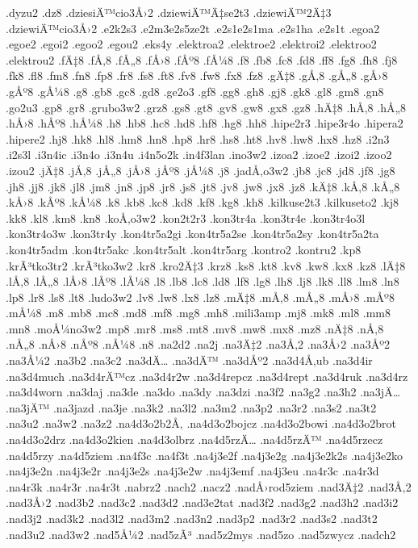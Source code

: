 {.dyzu2
.dz8
.dziesiÄ™cio3Å›2
.dziewiÄ™Ä‡se2t3
.dziewiÄ™2Ä‡3
.dziewiÄ™cio3Å›2
.e2k2s3
.e2m3e2s5ze2t
.e2s1e2s1ma
.e2s1ha
.e2s1t
.egoa2
.egoe2
.egoi2
.egoo2
.egou2
.eks4y
.elektroa2
.elektroe2
.elektroi2
.elektroo2
.elektrou2
.fÄ‡8
.fÅ‚8
.fÅ„8
.fÅ›8
.fÅº8
.fÅ¼8
.f8
.fb8
.fc8
.fd8
.ff8
.fg8
.fh8
.fj8
.fk8
.fl8
.fm8
.fn8
.fp8
.fr8
.fs8
.ft8
.fv8
.fw8
.fx8
.fz8
.gÄ‡8
.gÅ‚8
.gÅ„8
.gÅ›8
.gÅº8
.gÅ¼8
.g8
.gb8
.gc8
.gd8
.ge2o3
.gf8
.gg8
.gh8
.gj8
.gk8
.gl8
.gm8
.gn8
.go2u3
.gp8
.gr8
.grubo3w2
.grz8
.gs8
.gt8
.gv8
.gw8
.gx8
.gz8
.hÄ‡8
.hÅ‚8
.hÅ„8
.hÅ›8
.hÅº8
.hÅ¼8
.h8
.hb8
.hc8
.hd8
.hf8
.hg8
.hh8
.hipe2r3
.hipe3r4o
.hipera2
.hipere2
.hj8
.hk8
.hl8
.hm8
.hn8
.hp8
.hr8
.hs8
.ht8
.hv8
.hw8
.hx8
.hz8
.i2n3
.i2s3l
.i3n4ic
.i3n4o
.i3n4u
.i4n5o2k
.in4f3lan
.ino3w2
.izoa2
.izoe2
.izoi2
.izoo2
.izou2
.jÄ‡8
.jÅ‚8
.jÅ„8
.jÅ›8
.jÅº8
.jÅ¼8
.j8
.jadÅ‚o3w2
.jb8
.jc8
.jd8
.jf8
.jg8
.jh8
.jj8
.jk8
.jl8
.jm8
.jn8
.jp8
.jr8
.js8
.jt8
.jv8
.jw8
.jx8
.jz8
.kÄ‡8
.kÅ‚8
.kÅ„8
.kÅ›8
.kÅº8
.kÅ¼8
.k8
.kb8
.kc8
.kd8
.kf8
.kg8
.kh8
.kilkuse2t3
.kilkuseto2
.kj8
.kk8
.kl8
.km8
.kn8
.koÅ‚o3w2
.kon2t2r3
.kon3tr4a
.kon3tr4e
.kon3tr4o3l
.kon3tr4o3w
.kon3tr4y
.kon4tr5a2gi
.kon4tr5a2se
.kon4tr5a2sy
.kon4tr5a2ta
.kon4tr5adm
.kon4tr5akc
.kon4tr5alt
.kon4tr5arg
.kontro2
.kontru2
.kp8
.krÃ³tko3tr2
.krÃ³tko3w2
.kr8
.kro2Ä‡3
.krz8
.ks8
.kt8
.kv8
.kw8
.kx8
.kz8
.lÄ‡8
.lÅ‚8
.lÅ„8
.lÅ›8
.lÅº8
.lÅ¼8
.l8
.lb8
.lc8
.ld8
.lf8
.lg8
.lh8
.lj8
.lk8
.ll8
.lm8
.ln8
.lp8
.lr8
.ls8
.lt8
.ludo3w2
.lv8
.lw8
.lx8
.lz8
.mÄ‡8
.mÅ‚8
.mÅ„8
.mÅ›8
.mÅº8
.mÅ¼8
.m8
.mb8
.mc8
.md8
.mf8
.mg8
.mh8
.mili3amp
.mj8
.mk8
.ml8
.mm8
.mn8
.moÅ¼no3w2
.mp8
.mr8
.ms8
.mt8
.mv8
.mw8
.mx8
.mz8
.nÄ‡8
.nÅ‚8
.nÅ„8
.nÅ›8
.nÅº8
.nÅ¼8
.n8
.na2d2
.na2j
.na3Ä‡2
.na3Å‚2
.na3Å›2
.na3Åº2
.na3Å¼2
.na3b2
.na3c2
.na3dÄ…
.na3dÄ™
.na3dÅº2
.na3d4Å‚ub
.na3d4ir
.na3d4much
.na3d4rÄ™cz
.na3d4r2w
.na3d4repcz
.na3d4rept
.na3d4ruk
.na3d4rz
.na3d4worn
.na3daj
.na3de
.na3do
.na3dy
.na3dzi
.na3f2
.na3g2
.na3h2
.na3jÄ…
.na3jÄ™
.na3jazd
.na3je
.na3k2
.na3l2
.na3m2
.na3p2
.na3r2
.na3s2
.na3t2
.na3u2
.na3w2
.na3z2
.na4d3o2b2Å‚
.na4d3o2bojcz
.na4d3o2bowi
.na4d3o2brot
.na4d3o2drz
.na4d3o2kien
.na4d3olbrz
.na4d5rzÄ…
.na4d5rzÄ™
.na4d5rzecz
.na4d5rzy
.na4d5ziem
.na4f3c
.na4f3t
.na4j3e2f
.na4j3e2g
.na4j3e2k2s
.na4j3e2ko
.na4j3e2n
.na4j3e2r
.na4j3e2s
.na4j3e2w
.na4j3emf
.na4j3eu
.na4r3c
.na4r3d
.na4r3k
.na4r3r
.na4r3t
.nabrz2
.nach2
.nacz2
.nadÅ›rod5ziem
.nad3Ä‡2
.nad3Å‚2
.nad3Å›2
.nad3b2
.nad3c2
.nad3d2
.nad3e2tat
.nad3f2
.nad3g2
.nad3h2
.nad3i2
.nad3j2
.nad3k2
.nad3l2
.nad3m2
.nad3n2
.nad3p2
.nad3r2
.nad3s2
.nad3t2
.nad3u2
.nad3w2
.nad5Å¼2
.nad5zÃ³
.nad5z2mys
.nad5zo
.nad5zwycz
.nadch2
}
